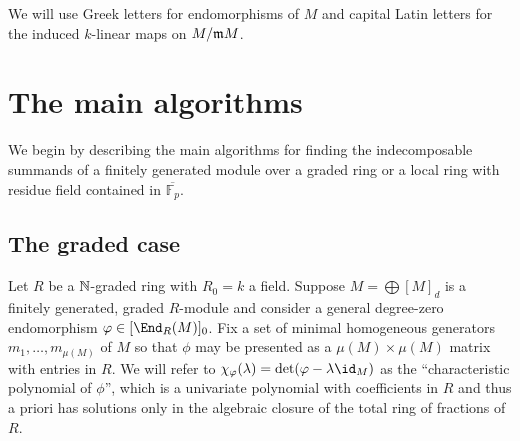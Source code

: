 \documentclass[12pt]{article}
\def\FF{\mathbb F}
\theoremstyle{theorem}
\numberwithin{thm}{section}
\theoremstyle{definition}
\begin{document}
We will use Greek letters for endomorphisms of $M$ and capital Latin letters for the induced $k$-linear maps on $M/\mathfrak m M$.

\section{The main algorithms}

We begin by describing the main algorithms for finding the indecomposable summands of a finitely generated module over a graded ring or a local ring with residue field contained in $\overline{\FF_p}$.

\subsection{The graded case}\label{sec:graded-alg}

Let $R$ be a $\mathbb N$-graded ring with $R_0 = k$ a field. Suppose $M = \bigoplus [M]_d$ is a finitely generated, graded $R$-module and consider a general degree-zero endomorphism $\phi \in [\End_R(M)]_0$. Fix a set of minimal homogeneous generators $m_1,\dots,m_{\mu(M)}$ of $M$ so that $\phi$ may be presented as a $\mu(M)\times\mu(M)$ matrix with entries in $R$. We will refer to $\chi_\phi(\lambda) = \det(\phi-\lambda\id_M)$ as the ``characteristic polynomial of $\phi$'', which is a univariate polynomial with coefficients in $R$ and thus a priori has solutions only in the algebraic closure of the total ring of fractions of $R$.
\end{document}
